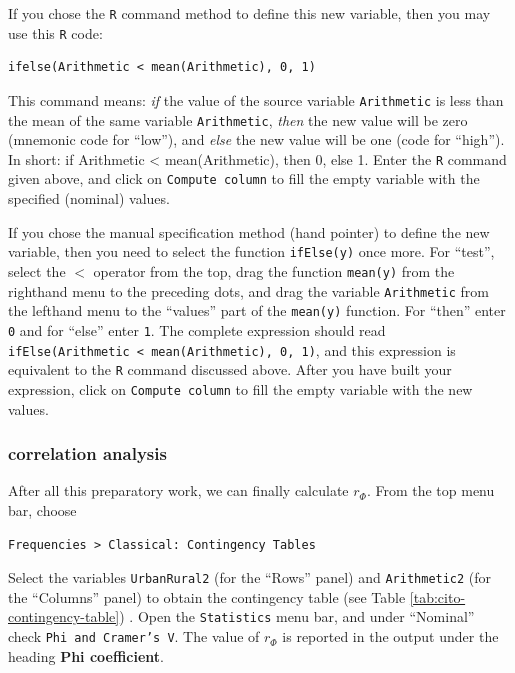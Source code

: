 \documentclass[
]{book}
\begin{document}
If you chose the \texttt{R} command method to define this new variable, then you may use this \texttt{R} code:

\begin{verbatim}
ifelse(Arithmetic < mean(Arithmetic), 0, 1)
\end{verbatim}

This command means: \emph{if} the value of the source variable \texttt{Arithmetic} is less than the mean of the same variable \texttt{Arithmetic}, \emph{then} the new value will be zero (mnemonic code for ``low''), and \emph{else} the new value will be one (code for ``high''). In short: if Arithmetic \textless{} mean(Arithmetic), then 0, else 1. Enter the \texttt{R} command given above, and click on \texttt{Compute\ column} to fill the empty variable with the specified (nominal) values.

If you chose the manual specification method (hand pointer) to define the new variable, then you need to select the function \texttt{ifElse(y)} once more. For ``test'', select the \(<\) operator from the top, drag the function \texttt{mean(y)} from the righthand menu to the preceding dots, and drag the variable \texttt{Arithmetic} from the lefthand menu to the ``values'' part of the \texttt{mean(y)} function. For ``then'' enter \texttt{0} and for ``else'' enter \texttt{1}. The complete expression should read \texttt{ifElse(Arithmetic\ \textless{}\ mean(Arithmetic),\ 0,\ 1)}, and this expression is equivalent to the \texttt{R} command discussed above.
After you have built your expression, click on \texttt{Compute\ column} to fill the empty variable with the new values.

\hypertarget{correlation-analysis-1}{%
\subsubsection{correlation analysis}\label{correlation-analysis-1}}

After all this preparatory work, we can finally calculate \(r_\Phi\). From the top menu bar, choose

\begin{verbatim}
Frequencies > Classical: Contingency Tables
\end{verbatim}

Select the variables \texttt{UrbanRural2} (for the ``Rows'' panel) and \texttt{Arithmetic2} (for the ``Columns'' panel) to obtain the contingency table (see Table \ref{tab:cito-contingency-table}) .
Open the \texttt{Statistics} menu bar, and under ``Nominal'' check \texttt{Phi\ and\ Cramer’s\ V}.
The value of \(r_\Phi\) is reported in the output under the heading \textbf{Phi coefficient}.
\end{document}
